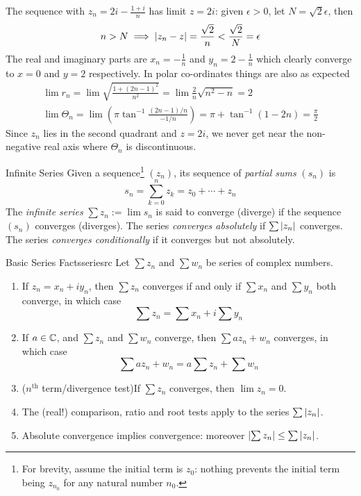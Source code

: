 \begin{example}{}{}
The sequence with $z_n=2i-\frac{1+i}n$ has limit $z=2i$: given $\epsilon>0$, let $N=\sqrt 2\epsilon$, then
\[n>N\implies \left| z_n-z\right|=\frac{\sqrt 2}n<\frac{\sqrt 2}N=\epsilon\]
The real and imaginary parts are $x_n=-\frac 1n$ and $y_n=2-\frac 1n$ which clearly converge to $x=0$ and $y=2$ respectively. In polar co-ordinates things are also as expected
\begin{gather*}
\lim r_n=\lim\sqrt{\frac{1+(2n-1)^2}{n^2}}=\lim\frac 2n\sqrt{n^2-n}=2\\
\lim\Theta_n=\lim\left(\pi\tan^{-1}\frac{(2n-1)/n}{-1/n}\right) =\pi+\tan^{-1}(1-2n)=\frac\pi 2
\end{gather*}
Since $z_n$ lies in the second quadrant and $z=2i$, we never get near the non-negative real axis where $\Theta_n$ is discontinuous.
\end{example}

\begin{defn}{Infinite Series}{}
Given a sequence\footnote{For brevity, assume the initial term is $z_0$: nothing prevents the initial term being $z_{n_0}$ for any natural number $n_0$.} $(z_n)$, its sequence of \emph{partial sums} $(s_n)$ is
\[s_n=\sum_{k=0}^nz_k=z_0+\cdots +z_n\]
The \emph{infinite series} $\sum z_n:= \lim s_n$ is said to converge (diverge) if the sequence $(s_n)$ converges (diverges).\smallbreak
The series \emph{converges absolutely} if $\sum \left| z_n\right|$ converges.\smallbreak
The series \emph{converges conditionally} if it converges but not absolutely.
\end{defn}

\begin{thm}{Basic Series Facts}{seriesrc}
Let $\sum z_n$ and $\sum w_n$ be series of complex numbers.
\begin{enumerate}\itemsep0pt
  \item If $z_n=x_n+iy_n$, then $\sum z_n$ converges if and only if $\sum x_n$ and $\sum y_n$ both converge, in which case
  \[\sum z_n=\sum x_n+i\sum y_n\]
  \item If $a\in\mathbb{C}$, and $\sum z_n$ and $\sum w_n$ converge, then $\sum az_n+w_n$ converges, in which case
  \[\sum az_n+w_n=a\sum z_n+\sum w_n\]
  \item ($n^\text{th}$ term/divergence test)\quad If $\sum z_n$ converges, then $\lim z_n=0$.
  \item The (real!) comparison, ratio and root tests apply to the series $\sum\left| z_n\right|$.
  \item Absolute convergence implies convergence: moreover $\left| \sum z_n\right|\le\sum\left| z_n\right|$.
\end{enumerate}
\end{thm}

